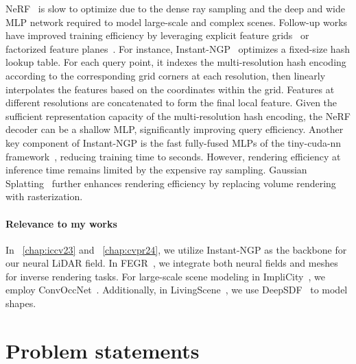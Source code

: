 NeRF~\cite{mildenhall2020nerf} is slow to optimize due to the dense ray sampling and the deep and wide MLP network required to model large-scale and complex scenes. Follow-up works have improved training efficiency by leveraging explicit feature grids~\cite{mueller2022instant,SunSC22,fridovich2022plenoxels,yu2021plenoxels} or factorized feature planes~\cite{chen2022tensorf,kplanes_2023}. For instance, Instant-NGP~\cite{mueller2022instant} optimizes a fixed-size hash lookup table. For each query point, it indexes the multi-resolution hash encoding according to the corresponding grid corners at each resolution, then linearly interpolates the features based on the coordinates within the grid. Features at different resolutions are concatenated to form the final local feature. Given the sufficient representation capacity of the multi-resolution hash encoding, the NeRF decoder can be a shallow MLP, significantly improving query efficiency. Another key component of Instant-NGP is the fast fully-fused MLPs of the tiny-cuda-nn framework~\cite{tiny-cuda-nn}, reducing training time to seconds. However, rendering efficiency at inference time remains limited by the expensive ray sampling. Gaussian Splatting~\cite{kerbl20233d} further enhances rendering efficiency by replacing volume rendering with rasterization.

\paragraph{Relevance to my works} In ~\cref{chap:iccv23} and ~\cref{chap:cvpr24}, we utilize Instant-NGP as the backbone for our neural LiDAR field. In FEGR~\cite{wang2023neural}, we integrate both neural fields and meshes for inverse rendering tasks. For large-scale scene modeling in ImpliCity~\cite{stucker2022implicity}, we employ ConvOccNet~\cite{peng2020convolutional}. Additionally, in LivingScene~\cite{zhu2023living}, we use DeepSDF~\cite{park2019deepsdf} to model shapes.


\section{Problem statements}
\label{sec:bg_problems}
